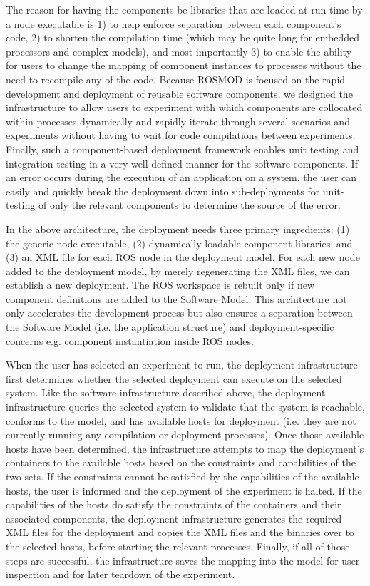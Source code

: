 The reason for having the components be libraries that are loaded at
run-time by a node executable is 1) to help enforce separation between
each component's code, 2) to shorten the compilation time (which may
be quite long for embedded processors and complex models), and most
importantly 3) to enable the ability for users to change the mapping
of component instances to processes without the need to recompile any
of the code.  Because ROSMOD is focused on the rapid development and
deployment of reusable software components, we designed the
infrastructure to allow users to experiment with which components are
collocated within processes dynamically and rapidly iterate through
several scenarios and experiments without having to wait for code
compilations between experiments.  Finally, such a component-based
deployment framework enables unit testing and integration testing in a
very well-defined manner for the software components.  If an error
occurs during the execution of an application on a system, the user
can easily and quickly break the deployment down into sub-deployments
for unit-testing of only the relevant components to determine the
source of the error.

In the above architecture, the deployment needs three primary
ingredients: (1) the generic node executable, (2) dynamically loadable
component libraries, and (3) an XML file for each ROS node in the
deployment model. For each new node added to the deployment model, by
merely regenerating the XML files, we can establish a new
deployment. The ROS workspace is rebuilt only if new component
definitions are added to the Software Model. This architecture not
only accelerates the development process but also ensures a separation
between the Software Model (i.e. the application structure) and
deployment-specific concerns e.g. component instantiation inside ROS
nodes.

When the user has selected an experiment to run, the deployment
infrastructure first determines whether the selected deployment can
execute on the selected system.  Like the software infrastructure
described above, the deployment infrastructure queries the selected
system to validate that the system is reachable, conforms to the
model, and has available hosts for deployment (i.e. they are not
currently running any compilation or deployment processes).  Once
those available hosts have been determined, the infrastructure
attempts to map the deployment's containers to the available hosts
based on the constraints and capabilities of the two sets.  If the
constraints cannot be satisfied by the capabilities of the available
hosts, the user is informed and the deployment of the experiment is
halted.  If the capabilities of the hosts do satisfy the constraints
of the containers and their associated components, the deployment
infrastructure generates the required XML files for the deployment and
copies the XML files and the binaries over to the selected hosts,
before starting the relevant processes.  Finally, if all of those
steps are successful, the infrastructure saves the mapping into the
model for user inspection and for later teardown of the experiment.

